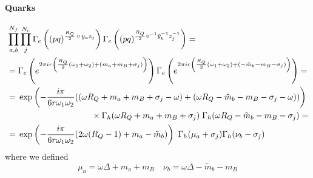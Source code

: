 \begin{appendices}
\paragraph{Quarks}
\begin{equation}
\begin{aligned}
&\prod_{a,b}^{N_f} \prod_{j}^{N_c}
\Gamma_e\left(
(pq)^{\frac{R_Q}{2} \, v \,  y_a z_j }\right) 
\Gamma_e\left(
(pq)^{\frac{R_Q}{2} v^{-1} \tilde y_b^{-1} z_j^{-1} } \right)  = \\
& =
\Gamma_e\left( e^{2 \pi i  r  \left( {R_Q \over 2} (\omega_1 + \omega_2)  + ( m_a + m_B + \sigma_j) \right) } \right )
\Gamma_e\left( e^{2 \pi i r  \left( {R_Q \over 2} (\omega_1 + \omega_2) + ( -\tilde{m}_b - m_B - \sigma_j) \right) } \right) = \\
& =   \,\exp \left( {- \frac{i \pi} {6 r \omega_1 \omega_2 }  ( ( \omega R_Q + m_a + m_B + \sigma_j -  \omega) + ( \omega R_Q -\tilde{m}_b - m_B - \sigma_j -  \omega))} \right) \\
& \qquad  \qquad \qquad \qquad \qquad  \times \Gamma_h ( \omega R_Q + m_a + m_B + \sigma_j) \; \Gamma_h ( \omega R_Q - \tilde{m}_b - m_B - \sigma_j) = \\
& =\, \exp \left( {- \frac{i \pi} {6 r \omega_1 \omega_2 }  ( 2 \omega (R_Q - 1) + m_a - \tilde{m}_b )} \right)  \, \, \Gamma_h ( \mu_a + \sigma_j) \Gamma_h ( \nu_b - \sigma_j)
\end{aligned}
\end{equation}
where we defined
\begin{equation}
 \mu_a = \omega \Delta + m_a + m_B  \quad  \nu_b = \omega \Delta - \tilde m_b - m_B
\end{equation}



\end{appendices}